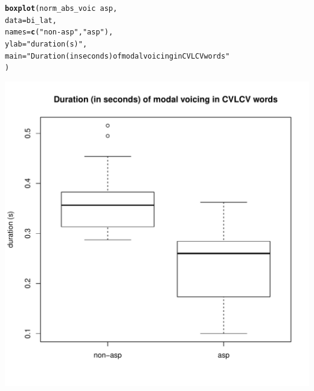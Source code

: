 \documentclass[a4paper,11pt]{article}\usepackage[]{graphicx}\usepackage[]{color}
\makeatletter
\def\maxwidth{ %
  \ifdim\Gin@nat@width>\linewidth
    \linewidth
  \else
    \Gin@nat@width
  \fi
}
\newcommand{\hlstr}[1]{\textcolor[rgb]{0.192,0.494,0.8}{#1}}%
\newcommand{\hlopt}[1]{\textcolor[rgb]{0,0,0}{#1}}%
\newcommand{\hlstd}[1]{\textcolor[rgb]{0.345,0.345,0.345}{#1}}%
\newcommand{\hlkwc}[1]{\textcolor[rgb]{0.333,0.667,0.333}{#1}}%
\newcommand{\hlkwd}[1]{\textcolor[rgb]{0.737,0.353,0.396}{\textbf{#1}}}%
\newenvironment{kframe}{%
 \def\at@end@of@kframe{}%
 \ifinner\ifhmode%
  \def\at@end@of@kframe{\end{minipage}}%
  \begin{minipage}{\columnwidth}%
 \fi\fi%
 \def\FrameCommand##1{\hskip\@totalleftmargin \hskip-\fboxsep
 \colorbox{shadecolor}{##1}\hskip-\fboxsep
     \hskip-\linewidth \hskip-\@totalleftmargin \hskip\columnwidth}%
 \MakeFramed {\advance\hsize-\width
   \@totalleftmargin\z@ \linewidth\hsize
   \@setminipage}}%
 {\par\unskip\endMakeFramed%
 \at@end@of@kframe}
\newenvironment{knitrout}{}{} %
\makeatother
\begin{document}
\begin{knitrout}
\end{knitrout}

\begin{knitrout}
\color{fgcolor}\begin{kframe}
\begin{alltt}
\hlkwd{boxplot}\hlstd{(norm_abs_voic} \hlopt{~} \hlstd{asp,}
        \hlkwc{data} \hlstd{= bi_lat,}
        \hlkwc{names} \hlstd{=} \hlkwd{c}\hlstd{(}\hlstr{"non-asp"}\hlstd{,} \hlstr{"asp"}\hlstd{),}
        \hlkwc{ylab} \hlstd{=} \hlstr{"duration (s)"}\hlstd{,}
        \hlkwc{main} \hlstd{=} \hlstr{"Duration (in seconds) of modal voicing in CVLCV words"}
        \hlstd{)}
\end{alltt}
\end{kframe}
\includegraphics[width=\maxwidth]{img/bi-lat-box-1} 

\end{knitrout}
\end{document}
